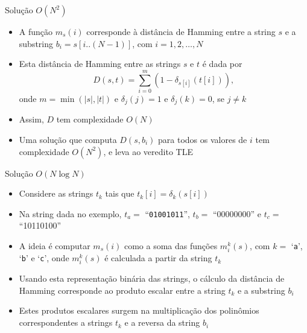 \begin{frame}[fragile]{Solução $O(N^2)$}

    \begin{itemize}
        \item A função $m_s(i)$ corresponde à distância de Hamming entre a string $s$ e a 
            substring $b_i = s[i..(N - 1)]$, com $i = 1, 2, \ldots, N$

        \item Esta distância de Hamming entre as strings $s$ e $t$ é dada por
        \[
            D(s, t) = \sum_{i = 0}^m (1 - \delta_{s[i]}(t[i])),
        \]
        onde $m = \min(|s|, |t|)$ e $\delta_j(j) = 1$ e $\delta_j(k) = 0$, se $j\neq k$

        \item Assim, $D$ tem complexidade $O(N)$

        \item Uma solução que computa $D(s, b_i)$ para todos os valores de $i$ tem complexidade
            $O(N^2)$, e leva ao veredito TLE
    \end{itemize}

\end{frame}

\begin{frame}[fragile]{Solução $O(N\log N)$}

    \begin{itemize}
        \item Considere as strings $t_k$ tais que $t_k[i] = \delta_k(s[i])$

        \item Na string dada no exemplo, $t_a =$ ``\texttt{01001011}'', $t_b =$ ``00000000'' e
            $t_c =$ ``10110100''

        \item A ideia é computar $m_s(i)$ como a soma das funções $m^k_i(s)$, com $k =$ 
            `\texttt{a}', `\texttt{b}' e `\texttt{c}', onde $m^k_i(s)$ é calculada a partir da
            string $t_k$

        \item Usando esta representação binária das strings, o cálculo da distância de Hamming 
            corresponde ao produto escalar entre a string $t_k$ e a substring $b_i$

        \item Estes produtos escalares surgem na multiplicação dos polinômios correspondentes a
            strings $t_k$ e a reversa da string $b_i$

    \end{itemize}

\end{frame}

